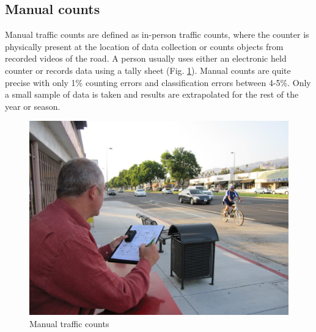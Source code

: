 \documentclass[twoside]{ctuthesis}
\theoremstyle{plain}
\theoremstyle{definition}
\theoremstyle{note}
\begin{document}
\subsection{Manual counts}
Manual traffic counts are defined as in-person traffic counts, where the counter is physically present at the location of data collection\cite{adebisi_1987} or counts objects from recorded videos of the road. A person usually uses either an electronic held counter or records data using a tally sheet (Fig. \ref{manual_count}). Manual counts are quite precise with only 1\% counting errors and classification errors between 4-5\%\cite{zheng_mike_2012}. 
 Only a small sample of data is taken and results are extrapolated for the rest of the year or season.  
 
\begin{figure}[h]
\caption{Manual traffic counts\cite{manual_count}}
\label{manual_count}
\includegraphics[width=.8\textwidth]{images/introduction/manual_count.jpg}
\end{figure}
 
\end{document}
